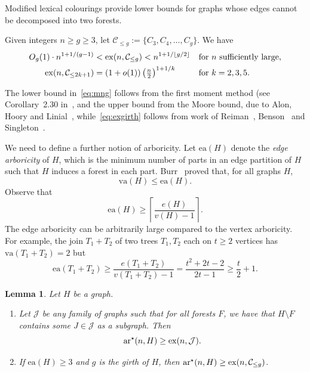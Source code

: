 \documentclass[a4paper, 12pt]{article}
\numberwithin{equation}{section}
\newtheorem{lemma}[theorem]{Lemma}
\def\sm{{\setminus}}
\def\sar{{\mathrm{ar}^{\star}}}
\def\ea{{\mathrm{ea}}}
\def\va{{\mathrm{va}}}
\newcommand{\mc}[1]{\mathcal{#1}}
\begin{document}
Modified lexical colourings provide lower bounds for graphs whose edges cannot be decomposed into two forests.

Given integers $n \geq g \geq 3$, let $\mc{C}_{\leq g} := \{C_3,C_4,\ldots,C_g\}$. We have
\begin{align}
\label{eq:mng}
O_g(1) \cdot n^{1+1/(g-1)} & < {\rm ex}(n,\mc{C}_{\leq g}) < n^{1+1/\lfloor g/2\rfloor} 
& & \text{for $n$ sufficiently large,}\\
\label{eq:exgirth}
{\rm ex}(n,\mc{C}_{\leq 2k+1}) & = (1+o(1))\left(\tfrac{n}{2}\right)^{1+1/k}
& & \text{for $k=2,3,5$}.
\end{align}

The lower bound in~\eqref{eq:mng} follows from the first moment method (see Corollary~2.30 in~\cite{FurediSimonovits}, and the upper bound from the Moore bound, due to Alon, Hoory and Linial~\cite{AlonHooryLinial},
while~\eqref{eq:exgirth} follows from work of Reiman~\cite{Reiman}, Benson~\cite{Benson} and Singleton~\cite{Singleton}.
    
We need to define a further notion of arboricity.
Let $\ea(H)$ denote the \emph{edge arboricity} of $H$, which is the minimum number of parts in an edge partition of $H$ such that $H$ induces a forest in each part.
Burr~\cite{Burr} proved that, for all graphs $H$,
$$
\va(H) \leq \ea(H).
$$
Observe that
\begin{equation}\label{eq:ea}
\ea(H) \geq \left\lceil \frac{e(H)}{v(H)-1}\right\rceil.
\end{equation}
The edge arboricity can be arbitrarily large compared to the vertex arboricity. For example, the join $T_1+T_2$ of two trees $T_1,T_2$ each on $t \geq 2$ vertices has $\va(T_1+T_2) = 2$ but $$
\ea(T_1+T_2) \geq \frac{e(T_1+T_2)}{v(T_1+T_2)-1} = \frac{t^2+2t-2}{2t-1} \geq \frac t2+1.
$$


\begin{lemma}\label{lm:modlexical}
Let $H$ be a graph.
\begin{enumerate}
\item
Let $\mc{J}$ be any family of graphs such that for all forests $F$, we have that $H \sm F$ contains some $J \in \mc{J}$ as a subgraph. Then
$$
\sar(n,H) \geq {\rm ex}(n,\mc{J}).
$$
\item If $\ea(H) \geq 3$ and $g$ is the girth of $H$, then $\sar(n,H) \geq {\rm ex}(n,\mc{C}_{\leq g})$.
\end{enumerate}
\end{lemma}
\end{document}
